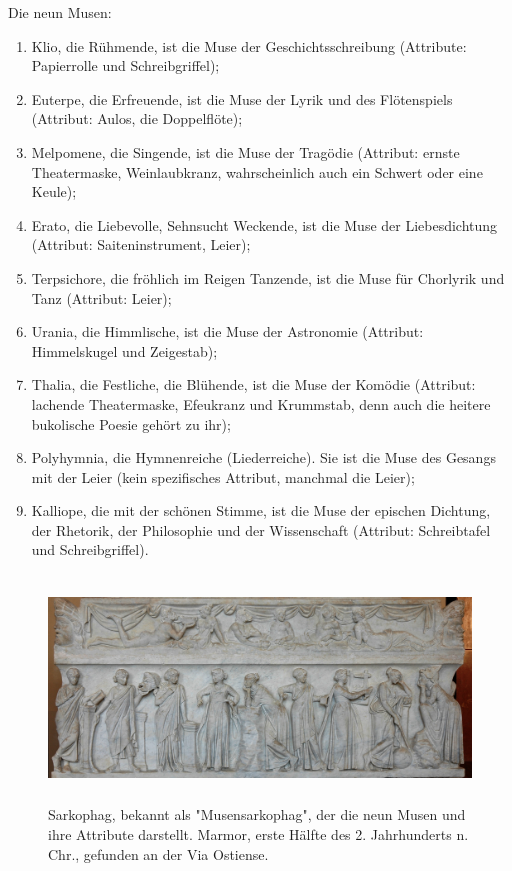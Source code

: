 \documentclass[a4paper]{amsart}
\theoremstyle{definition}
\begin{document}
Die neun Musen:
\begin{enumerate}
   \item Klio, die Rühmende, ist die Muse der Geschichtsschreibung (Attribute: Papierrolle und Schreibgriffel);
   \item Euterpe, die Erfreuende, ist die Muse der Lyrik und des Flötenspiels (Attribut: Aulos, die Doppelflöte);
   \item Melpomene, die Singende, ist die Muse der Tragödie (Attribut: ernste Theatermaske, Weinlaubkranz, wahrscheinlich auch ein Schwert oder eine Keule);
   \item Erato, die Liebevolle, Sehnsucht Weckende, ist die Muse der Liebesdichtung (Attribut: Saiteninstrument, Leier);
   \item Terpsichore, die fröhlich im Reigen Tanzende, ist die Muse für Chorlyrik und Tanz (Attribut: Leier);
   \item Urania, die Himmlische, ist die Muse der Astronomie (Attribut: Himmelskugel und Zeigestab);
   \item Thalia, die Festliche, die Blühende, ist die Muse der Komödie (Attribut: lachende Theatermaske, Efeukranz und Krummstab, denn auch die heitere bukolische Poesie gehört zu ihr);
   \item Polyhymnia, die Hymnenreiche (Liederreiche). Sie ist die Muse des Gesangs mit der Leier (kein spezifisches Attribut, manchmal die Leier);
   \item Kalliope, die mit der schönen Stimme, ist die Muse der epischen Dichtung, der Rhetorik, der Philosophie und der Wissenschaft (Attribut: Schreibtafel und Schreibgriffel).
\end{enumerate}

\begin{figure}
   \includegraphics[height=6cm]{Muses_sarcophagus_Louvre_MR880.jpg}
   \caption{Sarkophag, bekannt als "Musensarkophag", der die neun Musen und ihre Attribute darstellt. Marmor, erste Hälfte des 2. Jahrhunderts n. Chr., gefunden an der Via Ostiense.}
\end{figure}
\end{document}
